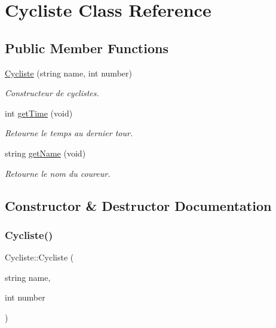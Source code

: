 \hypertarget{classCycliste}{}\section{Cycliste Class Reference}
\label{classCycliste}
\subsection*{Public Member Functions}
\begin{DoxyCompactItemize}
\item 
\hyperlink{classCycliste_a933a4bc9b34c0ed57b8fd727b1e1e38a}{Cycliste} (string name, int number)
\begin{DoxyCompactList}\small\item\em Constructeur de cyclistes. \end{DoxyCompactList}\item 
int \hyperlink{classCycliste_a9cef69b7cb1050fea25da277eea06940}{get\+Time} (void)
\begin{DoxyCompactList}\small\item\em Retourne le temps au dernier tour. \end{DoxyCompactList}\item 
string \hyperlink{classCycliste_a0c46061d327f2c76830904fb83a370a5}{get\+Name} (void)
\begin{DoxyCompactList}\small\item\em Retourne le nom du coureur. \end{DoxyCompactList}\end{DoxyCompactItemize}


\subsection{Constructor \& Destructor Documentation}
\mbox{\label{classCycliste_a933a4bc9b34c0ed57b8fd727b1e1e38a}} 
\subsubsection{\texorpdfstring{Cycliste()}{Cycliste()}}
{\footnotesize\ttfamily Cycliste\+::\+Cycliste (\begin{DoxyParamCaption}\item[{string}]{name,  }\item[{int}]{number }\end{DoxyParamCaption})}



